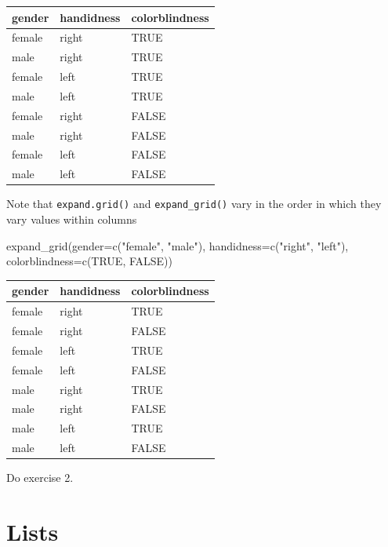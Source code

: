 \documentclass[
]{book}
\newenvironment{Shaded}{\begin{snugshade}}{\end{snugshade}}
\newcommand{\AttributeTok}[1]{\textcolor[rgb]{0.77,0.63,0.00}{#1}}
\newcommand{\ConstantTok}[1]{\textcolor[rgb]{0.00,0.00,0.00}{#1}}
\newcommand{\FunctionTok}[1]{\textcolor[rgb]{0.00,0.00,0.00}{#1}}
\newcommand{\NormalTok}[1]{#1}
\newcommand{\StringTok}[1]{\textcolor[rgb]{0.31,0.60,0.02}{#1}}
\begin{document}
\begin{tabular}{l|l|l}
\hline
gender & handidness & colorblindness\\
\hline
female & right & TRUE\\
\hline
male & right & TRUE\\
\hline
female & left & TRUE\\
\hline
male & left & TRUE\\
\hline
female & right & FALSE\\
\hline
male & right & FALSE\\
\hline
female & left & FALSE\\
\hline
male & left & FALSE\\
\hline
\end{tabular}

Note that \texttt{expand.grid()} and \texttt{expand\_grid()} vary in the order in which they vary values within columns

\begin{Shaded}
\begin{Highlighting}[]
\FunctionTok{expand\_grid}\NormalTok{(}\AttributeTok{gender=}\FunctionTok{c}\NormalTok{(}\StringTok{"female"}\NormalTok{, }\StringTok{"male"}\NormalTok{), }
            \AttributeTok{handidness=}\FunctionTok{c}\NormalTok{(}\StringTok{"right"}\NormalTok{, }\StringTok{"left"}\NormalTok{),}
            \AttributeTok{colorblindness=}\FunctionTok{c}\NormalTok{(}\ConstantTok{TRUE}\NormalTok{, }\ConstantTok{FALSE}\NormalTok{))}
\end{Highlighting}
\end{Shaded}

\begin{tabular}{l|l|l}
\hline
gender & handidness & colorblindness\\
\hline
female & right & TRUE\\
\hline
female & right & FALSE\\
\hline
female & left & TRUE\\
\hline
female & left & FALSE\\
\hline
male & right & TRUE\\
\hline
male & right & FALSE\\
\hline
male & left & TRUE\\
\hline
male & left & FALSE\\
\hline
\end{tabular}

Do exercise 2.

\hypertarget{list}{%
\section{Lists}\label{list}}
\end{document}
